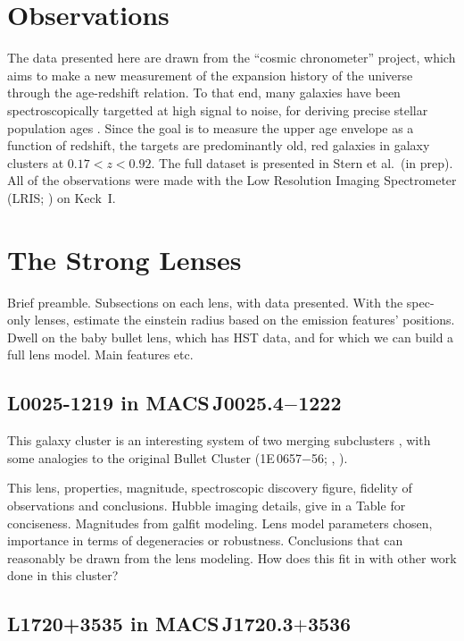 \message{ !name(clashresolved.tex)}\documentclass{emulateapj}
\begin{document}
\section{Observations}

The data presented here are drawn from the ``cosmic chronometer''
project, which aims to make a new measurement of the expansion history
of the universe through the age-redshift relation.  To that end, many
galaxies have been spectroscopically targetted at high signal to
noise, for deriving precise stellar population ages
\citet{jimenez:04}.  Since the goal is to measure the upper age
envelope as a function of redshift, the targets are predominantly old,
red galaxies in galaxy clusters at $0.17<z<0.92$.  The full dataset is
presented in Stern et al.~(in prep).  All of the observations were
made with the Low Resolution Imaging Spectrometer (LRIS;
\citealt{oke:95}) on Keck~I.

\section{The Strong Lenses}

Brief preamble. Subsections on each lens, with data presented. With
the spec-only lenses, estimate the einstein radius based on the
emission features' positions. Dwell on the baby bullet lens, which has
HST data, and for which we can build a full lens model. Main features
etc.

\subsection{L0025-1219 in MACS\,J0025.4$-$1222} 

This galaxy cluster is an interesting system of two merging
subclusters \citep{bradac:08}, with some analogies to the original
Bullet Cluster (1E\,0657$-$56; \citealt{clowe:06},
\citealt{bradac:06}). 

This lens, properties, magnitude, spectroscopic
discovery figure, fidelity of observations and conclusions. Hubble
imaging details, give in a Table for conciseness. Magnitudes from
galfit modeling. Lens model parameters chosen, importance in terms of
degeneracies or robustness. Conclusions that can reasonably be drawn
from the lens modeling. How does this fit in with other work done in
this cluster?

\subsection{L1720+3535 in MACS\,J1720.3$+$3536}
 
\end{document}
